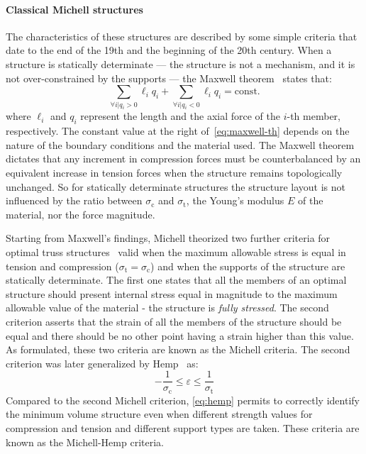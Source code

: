\paragraph{Classical Michell structures} \label{sec:03_michell}
The characteristics of these structures are described by some simple criteria that date to the end of the 19th and the beginning of the 20th century. When a structure is statically determinate — \ie the structure is not a mechanism, and it is not over-constrained by the supports — the Maxwell theorem~ states that:
\begin{equation} \label{eq:maxwell-th}
    \sum_{\forall i | q_i>0}\ell_iq_i + \sum_{\forall i | q_i<0}\ell_iq_i = \textrm{const.}
\end{equation}
where $\ell_i$ and $q_i$ represent the length and the axial force of the $i$-th member, respectively. The constant value at the right of~\eqref{eq:maxwell-th} depends on the nature of the boundary conditions and the material used. The Maxwell theorem dictates that any increment in compression forces must be counterbalanced by an equivalent increase in tension forces when the structure remains topologically unchanged. So for statically determinate structures the structure layout is not influenced by the ratio between $\sigma_\text{c}$ and $\sigma_\text{t}$, the Young's modulus $E$ of the material, nor the force magnitude.

Starting from Maxwell's findings, Michell theorized two further criteria for optimal truss structures~ valid when the maximum allowable stress is equal in tension and compression ($\sigma_\text{t} = \sigma_\text{c}$) and when the supports of the structure are statically determinate. The first one states that all the members of an optimal structure should present internal stress equal in magnitude to the maximum allowable value of the material - \ie the structure is \textit{fully stressed}. The second criterion asserts that the strain of all the members of the structure should be equal and there should be no other point having a strain higher than this value. As formulated, these two criteria are known as the Michell criteria. The second criterion was later generalized by Hemp~ as:
\begin{equation} \label{eq:hemp}
    -\frac{1}{\sigma_\text{c}}\leq \varepsilon \leq \frac{1}{\sigma_\text{t}}
\end{equation}
Compared to the second Michell criterion, \eqref{eq:hemp} permits to correctly identify the minimum volume structure even when different strength values for compression and tension and different support types are taken. These criteria are known as the Michell-Hemp criteria.

